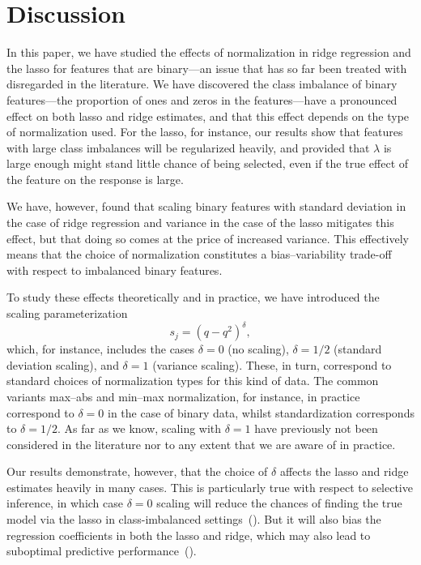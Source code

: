 \section{Discussion}\label{sec:discussion}

In this paper, we have studied the effects of normalization in ridge regression and the lasso for features that are binary---an issue that has so far been treated with disregarded in the literature. We have discovered the class imbalance of binary features---the proportion of ones and zeros in the features---have a pronounced effect on both lasso and ridge estimates, and that this effect depends on the type of normalization used. For the lasso, for instance, our results show that features with large class imbalances will be regularized heavily, and provided that \(\lambda\) is large enough might stand little chance of being selected, even if the true effect of the feature on the response is large.

We have, however, found that scaling binary features with standard deviation in the case of ridge regression and variance in the case of the lasso mitigates this effect, but that doing so comes at the price of increased variance. This effectively means that the choice of normalization constitutes a bias--variability trade-off with respect to imbalanced binary features.

To study these effects theoretically and in practice, we have introduced the scaling parameterization
\[
  s_j = (q - q^2)^\delta,
\]
which, for instance, includes the cases \(\delta=0\) (no scaling), \(\delta = 1/2\) (standard deviation scaling), and \(\delta=1\) (variance scaling). These, in turn, correspond to standard choices of normalization types for this kind of data. The common variants max--abs and min--max normalization, for instance, in practice correspond to \(\delta = 0\) in the case of binary data, whilst standardization corresponds to \(\delta = 1/2\). As far as we know, scaling with \(\delta=1\) have previously not been considered in the literature nor to any extent that we are aware of in practice.

Our results demonstrate, however, that the choice of \(\delta\) affects the lasso and ridge estimates heavily in many cases. This is particularly true with respect to selective inference, in which case \(\delta=0\) scaling will reduce the chances of finding the true model via the lasso in class-imbalanced settings~(). But it will also bias the regression coefficients in both the lasso and ridge, which may also lead to suboptimal predictive performance~().

